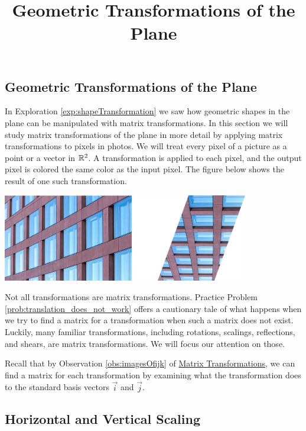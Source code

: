 \documentclass{ximera}
\title{Geometric Transformations of the Plane} \license{CC BY-NC-SA 4.0}
\begin{document}
\begin{abstract}
 \end{abstract}
\maketitle

\begin{onlineOnly}
\section*{Geometric Transformations of the Plane}
\end{onlineOnly}

In Exploration \ref{exp:shapeTransformation} we saw how geometric shapes in the plane can be manipulated with matrix transformations.  In this section we will study matrix transformations of the plane in more detail by applying matrix transformations to pixels in photos.  
We will treat every pixel of a picture as a point or a vector in $\mathbb{R}^2$.  A transformation is applied to each pixel, and the output pixel is colored the same color as the input pixel.  The figure below shows the result of one such transformation.

\begin{image}
         \includegraphics[height=1.5in]{twobuildings.jpg}
\end{image}

Not all transformations are matrix transformations.  Practice Problem \ref{prob:translation_does_not_work} offers a cautionary tale of what happens when we try to find a matrix for a transformation when such a matrix does not exist.
Luckily, many familiar transformations, including rotations, scalings, reflections, and shears, are matrix transformations. We will focus our attention on those.

Recall that by Observation \ref{obs:imagesOfijk} of \href{\xmbaseurl/LTR-0005/main}{Matrix Transformations}, we can find a matrix for each transformation by examining what the transformation does to the standard basis vectors $\vec{i}$ and $\vec{j}$. 

\subsection*{Horizontal and Vertical Scaling} 
\end{document}
